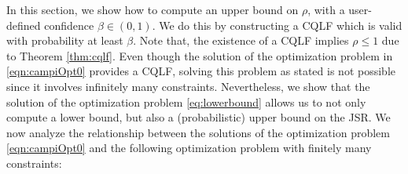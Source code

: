 In this section, we show how to compute an upper bound on $\rho$, with a user-defined confidence $\beta \in (0, 1)$. We do this by constructing a CQLF which is valid with probability at least $\beta$. Note that, the existence of a CQLF implies $\rho \leq 1$ due to Theorem \ref{thm:cqlf}.
Even though the solution of the optimization problem in \eqref{eqn:campiOpt0} provides a CQLF, solving this problem as stated is not possible since it involves infinitely many constraints. Nevertheless, we show that the solution of the optimization problem \eqref{eq:lowerbound} allows us to not only compute a lower bound, but also a (probabilistic) upper bound on the JSR.
We now analyze the relationship between the solutions of the optimization problem \eqref{eqn:campiOpt0} and the following optimization problem with finitely many constraints:
